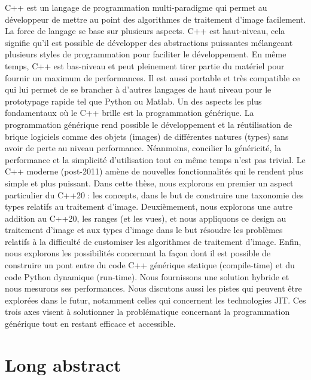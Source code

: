 \documentclass[11pt,a4paper]{book}
\begin{document}
C++ est un langage de programmation multi-paradigme qui permet au développeur de mettre au point des algorithmes de
traitement d'image facilement. La force de langage se base sur plusieurs aspects. C++ est haut-niveau, cela signifie
qu'il est possible de développer des abstractions puissantes mélangeant plusieurs styles de programmation pour faciliter
le développement. En même temps, C++ est bas-niveau et peut pleinement tirer partie du matériel pour fournir un maximum
de performances. Il est aussi portable et très compatible ce qui lui permet de se brancher à d'autres langages de haut
niveau pour le prototypage rapide tel que Python ou Matlab. Un des aspects les plus fondamentaux où le C++ brille est la
programmation générique. La programmation générique rend possible le développement et la réutilisation de brique
logiciels comme des objets (images) de différentes natures (types) sans avoir de perte au niveau performance. Néanmoins,
concilier la généricité, la performance et la simplicité d'utilisation tout en même temps n'est pas trivial. Le C++
moderne (post-2011) amène de nouvelles fonctionnalités qui le rendent plus simple et plus puissant. Dans cette thèse,
nous explorons en premier un aspect particulier du C++20 : les concepts, dans le but de construire une taxonomie des
types relatifs au traitement d'image. Deuxièmement, nous explorons une autre addition au C++20, les ranges (et les
vues), et nous appliquons ce design au traitement d'image et aux types d'image dans le but résoudre les problèmes
relatifs à la difficulté de customiser les algorithmes de traitement d'image. Enfin, nous explorons les possibilités
concernant la façon dont il est possible de construire un pont entre du code C++ générique statique (compile-time) et du
code Python dynamique (run-time). Nous fournissons une solution hybride et nous mesurons ses performances. Nous
discutons aussi les pistes qui peuvent être explorées dans le futur, notamment celles qui concernent les technologies
JIT. Ces trois axes visent à solutionner la problématique concernant la programmation générique tout en restant efficace
et accessible.

\section{Long abstract}
\label{sec.:long_abstract}


\tableofcontents
\label{table.of.contents}

\listoffigures
\label{list.of.figures}

\listoftables
\label{list.of.tables}
\end{document}
